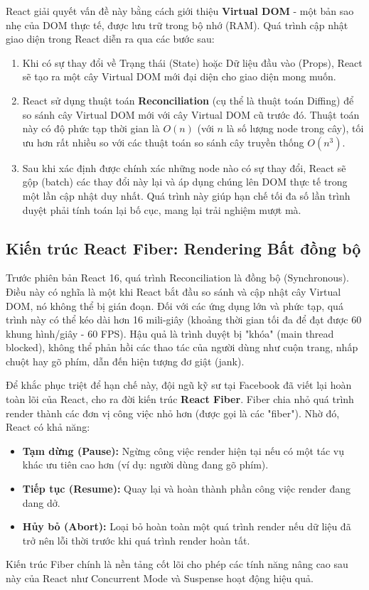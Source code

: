 React giải quyết vấn đề này bằng cách giới thiệu \textbf{Virtual DOM} - một bản sao nhẹ của DOM thực tế, được lưu trữ trong bộ nhớ (RAM). Quá trình cập nhật giao diện trong React diễn ra qua các bước sau:
\begin{enumerate}
    \item Khi có sự thay đổi về Trạng thái (State) hoặc Dữ liệu đầu vào (Props), React sẽ tạo ra một cây Virtual DOM mới đại diện cho giao diện mong muốn.
    \item React sử dụng thuật toán \textbf{Reconciliation} (cụ thể là thuật toán Diffing) để so sánh cây Virtual DOM mới với cây Virtual DOM cũ trước đó. Thuật toán này có độ phức tạp thời gian là $O(n)$ (với $n$ là số lượng node trong cây), tối ưu hơn rất nhiều so với các thuật toán so sánh cây truyền thống $O(n^3)$.
    \item Sau khi xác định được chính xác những node nào có sự thay đổi, React sẽ gộp (batch) các thay đổi này lại và áp dụng chúng lên DOM thực tế trong một lần cập nhật duy nhất. Quá trình này giúp hạn chế tối đa số lần trình duyệt phải tính toán lại bố cục, mang lại trải nghiệm mượt mà.
\end{enumerate}

\subsection{Kiến trúc React Fiber: Rendering Bất đồng bộ}
Trước phiên bản React 16, quá trình Reconciliation là đồng bộ (Synchronous). Điều này có nghĩa là một khi React bắt đầu so sánh và cập nhật cây Virtual DOM, nó không thể bị gián đoạn. Đối với các ứng dụng lớn và phức tạp, quá trình này có thể kéo dài hơn 16 mili-giây (khoảng thời gian tối đa để đạt được 60 khung hình/giây - 60 FPS). Hậu quả là trình duyệt bị "khóa" (main thread blocked), không thể phản hồi các thao tác của người dùng như cuộn trang, nhấp chuột hay gõ phím, dẫn đến hiện tượng đơ giật (jank).

Để khắc phục triệt để hạn chế này, đội ngũ kỹ sư tại Facebook đã viết lại hoàn toàn lõi của React, cho ra đời kiến trúc \textbf{React Fiber}. Fiber chia nhỏ quá trình render thành các đơn vị công việc nhỏ hơn (được gọi là các "fiber"). Nhờ đó, React có khả năng:
\begin{itemize}
    \item \textbf{Tạm dừng (Pause):} Ngừng công việc render hiện tại nếu có một tác vụ khác ưu tiên cao hơn (ví dụ: người dùng đang gõ phím).
    \item \textbf{Tiếp tục (Resume):} Quay lại và hoàn thành phần công việc render đang dang dở.
    \item \textbf{Hủy bỏ (Abort):} Loại bỏ hoàn toàn một quá trình render nếu dữ liệu đã trở nên lỗi thời trước khi quá trình render hoàn tất.
\end{itemize}
Kiến trúc Fiber chính là nền tảng cốt lõi cho phép các tính năng nâng cao sau này của React như Concurrent Mode và Suspense hoạt động hiệu quả.

